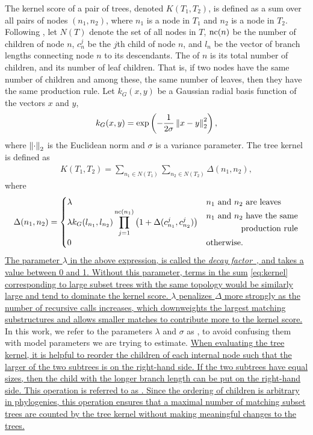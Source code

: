 The kernel score of a pair of trees, denoted $K(T_1, T_2)$, is defined as a sum
over all pairs of nodes $(n_1, n_2)$, where $n_1$ is a node in $T_1$ and $n_2$
is a node in $T_2$. Following \textcite{poon2013mapping}, let $N(T)$ denote the
set of all nodes in $T$, $\operatorname{nc}(n)$ be the number of children of node $n$,
$c_n^{j}$ be the $j$th child of node $n$, and $l_n$ be the vector of branch
lengths connecting node $n$ to its descendants. The  of
$n$ is its total number of children, and its number of leaf children. That is,
if two nodes have the same number of children and among these, the same number
of leaves, then they have the same production rule. Let $k_G(x, y)$ be a
Gaussian radial basis function of the vectors $x$ and $y$,
\[
  k_G(x, y) = \exp\left(-\frac{1}{2\sigma} \left\lVert x - y\right\rVert_2^2\right),
\]
where $\left\lVert\cdot\right\rVert_2$ is the Euclidean norm and $\sigma$ is a variance
parameter. The tree kernel is defined as 
\begin{align}
  K(T_1, T_2) = \sum_{n_1 \in N(T_1)} \sum_{n_2 \in N(T_2)} \Delta (n_1, n_2),
  \label{eq:kernel}
\end{align}
where
\[
  \Delta(n_1, n_2) =
  \begin{cases}
    \lambda & n_1 \text{ and } n_2 \text{ are leaves} \\
    \lambda k_G(l_{n_1}, l_{n_2}) \displaystyle\prod_{j=1}^{\operatorname{nc}(n_1)} \left(1 +
    \Delta(c_{n_1}^j, c_{n_2}^j) \right) & \begin{aligned} n_1 \text{ and } n_2 \text{ have the same} \\ \text{production rule} \end{aligned} \\
    0 & \text{otherwise}.
  \end{cases}
\]
{\color{blue}\uline{
The parameter $\lambda$ in the above expression, is called the \emph{decay
factor}~\autocite{moschitti2006making}, and takes a value between 0 and 1.
Without this parameter, terms in the sum} \ref{eq:kernel} \uline{corresponding
to large subset trees with the same topology would be similarly large and tend
to dominate the kernel score. $\lambda$ penalizes $\Delta$ more strongly as the
number of recursive calls increases, which downweights the largest matching
substructures and allows smaller matches to contribute more to the kernel
score. }} In this work, we refer to the parameters $\lambda$ and $\sigma$ as
, to avoid confusing them with model parameters we are
trying to estimate. {\color{blue}\uline{ When evaluating the tree kernel, it is
helpful to reorder the children of each internal node such that the larger of
the two subtrees is on the right-hand side. If the two subtrees have equal
sizes, then the child with the longer branch length can be put on the
right-hand side. This operation is referred to as . Since the
ordering of children is arbitrary in phylogenies, this operation ensures that a
maximal number of matching subset trees are counted by the tree kernel without 
making meaningful changes to the trees. }}

